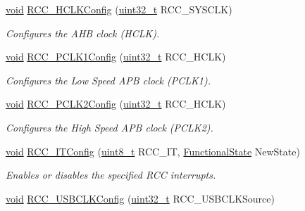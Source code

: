 \begin{DoxyCompactItemize}
\hyperlink{usb__devapi_8h_afabf60e7f57651d6d595a02c75f07cd0}{void} \hyperlink{group___r_c_c___exported___functions_ga9d0aec72e236c6cdf3a3a82dfb525491}{R\+C\+C\+\_\+\+H\+C\+L\+K\+Config} (\hyperlink{_p_e___types_8h_a33594304e786b158f3fb30289278f5af}{uint32\+\_\+t} R\+C\+C\+\_\+\+S\+Y\+S\+C\+LK)
\begin{DoxyCompactList}\small\item\em Configures the A\+HB clock (H\+C\+LK). \end{DoxyCompactList}\item 
\hyperlink{usb__devapi_8h_afabf60e7f57651d6d595a02c75f07cd0}{void} \hyperlink{group___r_c_c___exported___functions_ga448137346d4292985d4e7a61dd1a824f}{R\+C\+C\+\_\+\+P\+C\+L\+K1\+Config} (\hyperlink{_p_e___types_8h_a33594304e786b158f3fb30289278f5af}{uint32\+\_\+t} R\+C\+C\+\_\+\+H\+C\+LK)
\begin{DoxyCompactList}\small\item\em Configures the Low Speed A\+PB clock (P\+C\+L\+K1). \end{DoxyCompactList}\item 
\hyperlink{usb__devapi_8h_afabf60e7f57651d6d595a02c75f07cd0}{void} \hyperlink{group___r_c_c___exported___functions_ga09f9c010a4adca9e036da42c2ca6126a}{R\+C\+C\+\_\+\+P\+C\+L\+K2\+Config} (\hyperlink{_p_e___types_8h_a33594304e786b158f3fb30289278f5af}{uint32\+\_\+t} R\+C\+C\+\_\+\+H\+C\+LK)
\begin{DoxyCompactList}\small\item\em Configures the High Speed A\+PB clock (P\+C\+L\+K2). \end{DoxyCompactList}\item 
\hyperlink{usb__devapi_8h_afabf60e7f57651d6d595a02c75f07cd0}{void} \hyperlink{group___r_c_c___exported___functions_gaa953aa226e9ce45300d535941e4dfe2f}{R\+C\+C\+\_\+\+I\+T\+Config} (\hyperlink{_p_e___types_8h_aba7bc1797add20fe3efdf37ced1182c5}{uint8\+\_\+t} R\+C\+C\+\_\+\+IT, \hyperlink{agilefox_2library_2inc_2stm32f10x__type_8h_ac9a7e9a35d2513ec15c3b537aaa4fba1}{Functional\+State} New\+State)
\begin{DoxyCompactList}\small\item\em Enables or disables the specified R\+CC interrupts. \end{DoxyCompactList}\item 
\hyperlink{usb__devapi_8h_afabf60e7f57651d6d595a02c75f07cd0}{void} \hyperlink{group___r_c_c___exported___functions_ga895b3ff3d143c990f1cd0146aa260081}{R\+C\+C\+\_\+\+U\+S\+B\+C\+L\+K\+Config} (\hyperlink{_p_e___types_8h_a33594304e786b158f3fb30289278f5af}{uint32\+\_\+t} R\+C\+C\+\_\+\+U\+S\+B\+C\+L\+K\+Source)

\end{DoxyCompactItemize}
